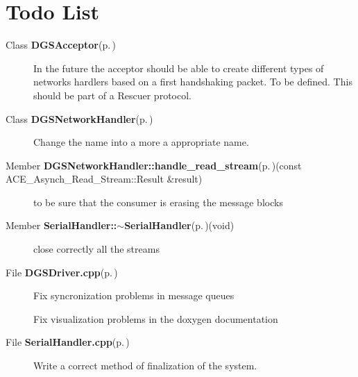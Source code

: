 \section{Todo List}\label{todo}
\label{todo__todo000001}
 \begin{description}
\item[Class {\bf DGSAcceptor}{\rm (p.\,\pageref{classDGSAcceptor})} ]In the future the acceptor should be able to create different types of networks hardlers based on a first handshaking packet. To be defined. This should be part of a Rescuer protocol. \end{description}


\label{todo__todo000004}
 \begin{description}
\item[Class {\bf DGSNetwork\-Handler}{\rm (p.\,\pageref{classDGSNetworkHandler})} ]Change the name into a more a appropriate name. \end{description}


\label{todo__todo000003}
 \begin{description}
\item[Member {\bf DGSNetwork\-Handler::handle\_\-read\_\-stream}{\rm (p.\,\pageref{classDGSNetworkHandler_b0})}(const ACE\_\-Asynch\_\-Read\_\-Stream::Result \&result) ]to be sure that the consumer is erasing the message blocks\end{description}


\label{todo__todo000006}
 \begin{description}
\item[Member {\bf Serial\-Handler::$\sim$Serial\-Handler}{\rm (p.\,\pageref{classSerialHandler_a1})}(void) ]close correctly all the streams \end{description}


\label{todo__todo000002}
 \begin{description}
\item[File {\bf DGSDriver.cpp}{\rm (p.\,\pageref{DGSDriver_8cpp})} ]Fix syncronization problems in message queues 

Fix visualization problems in the doxygen documentation \end{description}


\label{todo__todo000005}
 \begin{description}
\item[File {\bf Serial\-Handler.cpp}{\rm (p.\,\pageref{SerialHandler_8cpp})} ]Write a correct method of finalization of the system. \end{description}
